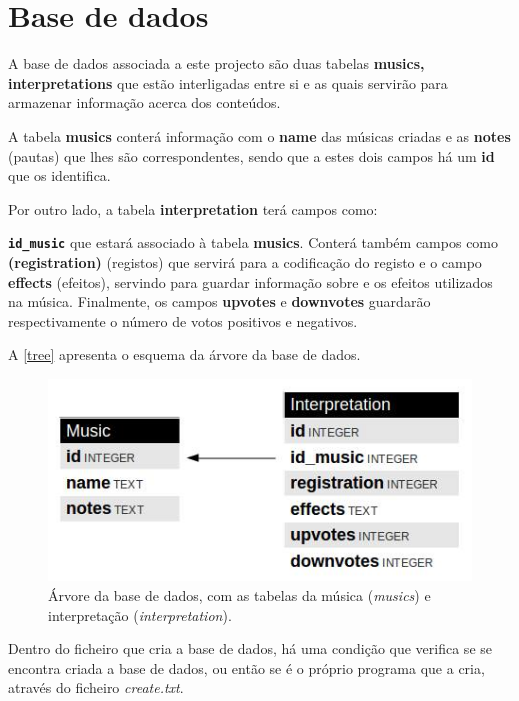 \chapter{Base de dados}
\label{chap.base}

A base de dados associada a este projecto são duas tabelas \textbf{musics, interpretations} que estão interligadas entre si e as quais servirão para armazenar informação acerca dos conteúdos.

A tabela \textbf{musics} conterá informação com o \textbf{name} das músicas criadas e as \textbf{notes} (pautas) que lhes são correspondentes, sendo que a estes dois campos há um \textbf{id} que os identifica.

Por outro lado, a tabela \textbf{interpretation} terá campos como:

\textbf{\texttt{id\_music}} que estará associado à tabela \textbf{musics}. Conterá também campos como \textbf{(registration)} (registos) que servirá para a codificação do registo  e o campo \textbf{effects} (efeitos), servindo para guardar informação sobre e os efeitos utilizados na música.
Finalmente, os campos \textbf{upvotes} e \textbf{downvotes} guardarão respectivamente o número de votos positivos e negativos.

A \autoref{tree} apresenta o esquema da árvore da base de dados.

\begin{figure}[htp]
\centering
\includegraphics[width=\textwidth]{images/tree.jpg}
\caption{Árvore da base de dados, com as tabelas da música (\emph{musics}) e interpretação (\emph{interpretation}).}
\label{tree}
\end{figure}

Dentro do ficheiro que cria a base de dados, há uma condição que verifica se se encontra criada a base de dados, ou então se é o próprio programa que a cria, através do ficheiro \emph{create.txt}.

